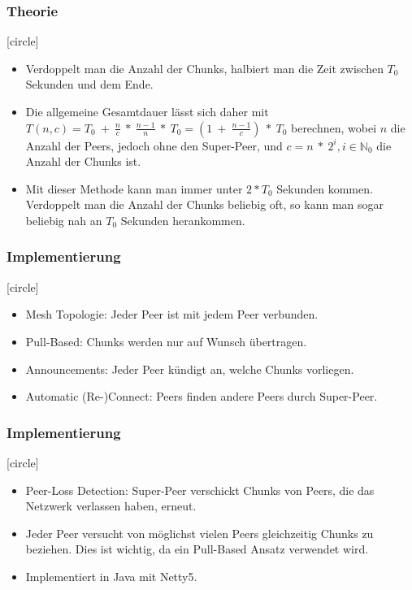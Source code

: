 \begin{frame}
  \frametitle{Theorie}

  [circle]
  \begin{itemize}  
    \item Verdoppelt man die Anzahl der Chunks, halbiert man die Zeit zwischen $T_0$ Sekunden und dem Ende.
    \item Die allgemeine Gesamtdauer lässt sich daher mit $T(n, c) = T_0\:+\:\frac{n}{c}\:*\:\frac{n-1}{n}\:*\:T_0 = (1\:+\:\frac{n-1}{c})\:*\:T_0$ berechnen, wobei $n$ die Anzahl der Peers, jedoch ohne den Super-Peer, und $c = n\:*\:2^i, i \in \mathbb{N}_0$ die Anzahl der Chunks ist.

    \item Mit dieser Methode kann man immer unter $2 * T_0$ Sekunden kommen. Verdoppelt man die Anzahl der Chunks beliebig oft, so kann man sogar beliebig nah an $T_0$ Sekunden herankommen.
  \end{itemize} 

\end{frame}





\begin{frame}
  \frametitle{Implementierung}

  [circle]
  \begin{itemize}  
    \item Mesh Topologie: Jeder Peer ist mit jedem Peer verbunden.
    \item Pull-Based: Chunks werden nur auf Wunsch übertragen.
    \item Announcements: Jeder Peer kündigt an, welche Chunks vorliegen.
    \item Automatic (Re-)Connect: Peers finden andere Peers durch Super-Peer.
  \end{itemize} 

\end{frame}

\begin{frame}
  \frametitle{Implementierung}

  [circle]
  \begin{itemize}  
    \item Peer-Loss Detection: Super-Peer verschickt Chunks von Peers, die das Netzwerk verlassen haben, erneut.
    \item Jeder Peer versucht von möglichst vielen Peers gleichzeitig Chunks zu beziehen. Dies ist wichtig, da ein Pull-Based Ansatz verwendet wird.
    \item Implementiert in Java mit Netty5.
  \end{itemize} 

\end{frame}

